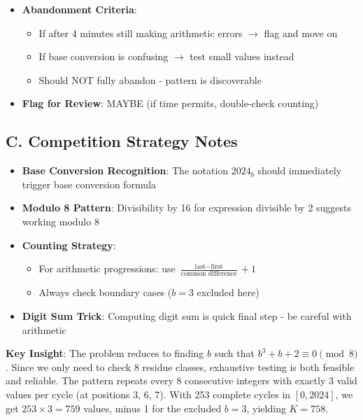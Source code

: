 \documentclass[11pt]{article}
\begin{document}
\begin{competitionbox}
\begin{itemize}[leftmargin=*]
    \item \textbf{Abandonment Criteria}: 
    \begin{itemize}
        \item If after 4 minutes still making arithmetic errors $\rightarrow$ flag and move on
        \item If base conversion is confusing $\rightarrow$ test small values instead
        \item Should NOT fully abandon - pattern is discoverable
    \end{itemize}
    
    \item \textbf{Flag for Review}: MAYBE (if time permits, double-check counting)
\end{itemize}

\subsection*{C. Competition Strategy Notes}
\begin{itemize}[leftmargin=*]
    \item \textbf{Base Conversion Recognition}: The notation $2024_b$ should immediately trigger base conversion formula
    
    \item \textbf{Modulo 8 Pattern}: Divisibility by 16 for expression divisible by 2 suggests working modulo 8
    
    \item \textbf{Counting Strategy}: 
    \begin{itemize}
        \item For arithmetic progressions: use $\frac{\text{last} - \text{first}}{\text{common difference}} + 1$
        \item Always check boundary cases ($b = 3$ excluded here)
    \end{itemize}
    
    \item \textbf{Digit Sum Trick}: Computing digit sum is quick final step - be careful with arithmetic
\end{itemize}
\end{competitionbox}

\begin{keyinsightbox}
\textbf{Key Insight}: The problem reduces to finding $b$ such that $b^3 + b + 2 \equiv 0 \pmod{8}$. Since we only need to check 8 residue classes, exhaustive testing is both feasible and reliable. The pattern repeats every 8 consecutive integers with exactly 3 valid values per cycle (at positions 3, 6, 7). With 253 complete cycles in $[0, 2024]$, we get $253 \times 3 = 759$ values, minus 1 for the excluded $b = 3$, yielding $K = 758$.
\end{keyinsightbox}
\end{document}
